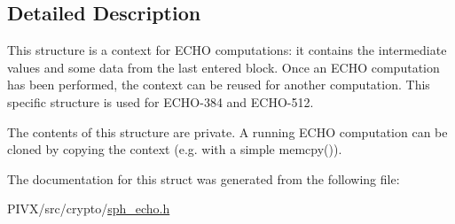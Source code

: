 \subsection{Detailed Description}
This structure is a context for E\+C\+HO computations\+: it contains the intermediate values and some data from the last entered block. Once an E\+C\+HO computation has been performed, the context can be reused for another computation. This specific structure is used for E\+C\+H\+O-\/384 and E\+C\+H\+O-\/512.

The contents of this structure are private. A running E\+C\+HO computation can be cloned by copying the context (e.\+g. with a simple {\ttfamily memcpy()}). 

The documentation for this struct was generated from the following file\+:\begin{DoxyCompactItemize}
\item 
P\+I\+V\+X/src/crypto/\mbox{\hyperlink{sph__echo_8h}{sph\+\_\+echo.\+h}}\end{DoxyCompactItemize}
